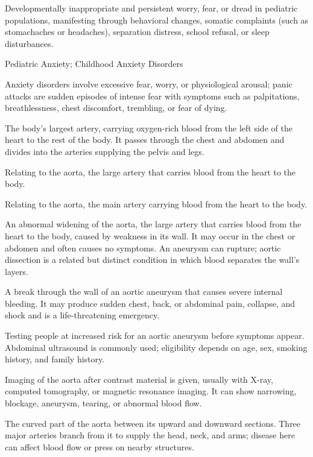  Developmentally inappropriate and persistent worry, fear, or dread in pediatric populations, manifesting through behavioral changes, somatic complaints (such as stomachaches or headaches), separation distress, school refusal, or sleep disturbances.

\synonyms
Pediatric Anxiety; Childhood Anxiety Disorders

 Anxiety disorders involve excessive fear, worry, or physiological arousal; panic attacks are sudden episodes of intense fear with symptoms such as palpitations, breathlessness, chest discomfort, trembling, or fear of dying.

 The body’s largest artery, carrying oxygen-rich blood from the left side of the heart to the rest of the body. It passes through the chest and abdomen and divides into the arteries supplying the pelvis and legs.

 Relating to the aorta, the large artery that carries blood from the heart to the body.

 Relating to the aorta, the main artery carrying blood from the heart to the body.

 An abnormal widening of the aorta, the large artery that carries blood from the heart to the body, caused by weakness in its wall. It may occur in the chest or abdomen and often causes no symptoms. An aneurysm can rupture; aortic dissection is a related but distinct condition in which blood separates the wall's layers.

 A break through the wall of an aortic aneurysm that causes severe internal bleeding. It may produce sudden chest, back, or abdominal pain, collapse, and shock and is a life-threatening emergency.

 Testing people at increased risk for an aortic aneurysm before symptoms appear. Abdominal ultrasound is commonly used; eligibility depends on age, sex, smoking history, and family history.

 Imaging of the aorta after contrast material is given, usually with X-ray, computed tomography, or magnetic resonance imaging. It can show narrowing, blockage, aneurysm, tearing, or abnormal blood flow.

 The curved part of the aorta between its upward and downward sections. Three major arteries branch from it to supply the head, neck, and arms; disease here can affect blood flow or press on nearby structures.

